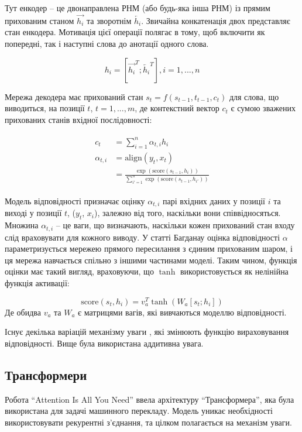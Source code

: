 \documentclass[a4paper,14pt]{extreport}
\begin{document}
Тут енкодер -- це двонаправлена РНМ (або будь-яка інша РНМ) із прямим
прихованим станом $\overrightarrow{h_i}$ та зворотнім
$\overleftarrow{h_i}$. Звичайна конкатенація двох представляє стан
енкодера. Мотивація цієї операції
полягає в тому, щоб включити як попередні, так і наступні
слова до анотації одного слова.

\begin{equation}
    h_i = [\overrightarrow{h_i}^T;\overleftarrow{h_i}^T], i=1, ..., n
\end{equation}

Мережа декодера має прихований стан $s_t = f(s_{t-1},t_{t-1},c_t)$
для слова, що виводиться, на позиції $t$, $t = 1, ..., m$,
де контекстний вектор $c_t$ є сумою зважених прихованих станів
вхідної послідовності:

\begin{gather}
\begin{aligned}
    c_t          &= \sum^n_{i=1}\alpha_{t,i} h_i \\
    \alpha_{t,i} &= \text{align}(y_t,x_t) \\
    &= \frac{\exp(\text{score}(s_{t-1}, h_i))}{\sum^n_{i'=1}\exp(\text{score}(s_{t-1},h_{i'}))}
\end{aligned}
\end{gather}

Модель відповідності призначає оцінку $\alpha_{t,i}$
парі вхідних даних у позиції $i$ та виході у позиції $t$, ($y_t$, $x_i$),
залежно від того, наскільки вони співвідносяться. Множина
${α_{t,i}}$ -- це ваги, що визначають, наскільки кожен прихований стан
входу слід враховувати для кожного виводу.
У статті Багданау \cite{nn:attention} оцінка відповідності
$α$ параметризується мережею прямого пересилання
з єдиним прихованим шаром, і ця мережа навчається спільно з
іншими частинами моделі. Таким чином, функція оцінки
має такий вигляд, враховуючи, що $\tanh$ використовується як
нелінійна функція активації:

\begin{equation}
    \text{score}(s_t, h_i) = v^T_a \tanh(W_a [s_t;h_i])
\end{equation}
Де обидва $v_a$ та $W_a$ є матрицями вагів, які вивчаються
моделлю відповідності.

Існує декілька варіацій механізму
уваги \cite{attention:1} \cite{attention:2}, які змінюють
функцію вираховування відповідності. Вище
була використана аддитивна \cite{nn:attention} увага.

\subsection{Трансформери}
Робота ``Attention Is All You Need'' \cite{attention-all-need}
ввела архітектуру
``Трансформера'', яка була використана для задачі машинного
перекладу. Модель уникає необхідності використовувати
рекурентні з'єднання, та цілком полагається на
механізм уваги.
\end{document}
